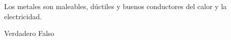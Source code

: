 \begin{multicols}{2}
\begin{parts}



















        Los metales son maleables, dúctiles y buenos conductores del calor y la electricidad.

        \begin{oneparcheckboxes}
            \CorrectChoice Verdadero
            \choice Falso
        \end{oneparcheckboxes}



\end{parts}
\end{multicols}
